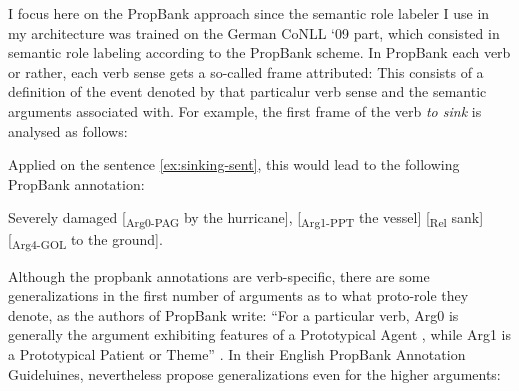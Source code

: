 I focus here on the PropBank approach since the semantic role labeler I use in my
architecture was trained on the German CoNLL `09 \citep{hajivc2009conll} part, which
consisted in semantic role labeling according to the PropBank scheme. In PropBank
each verb or rather, each verb sense gets a so-called frame attributed: This consists
of a definition of the event denoted by that particalur verb sense and the semantic
arguments associated with. For example, the first frame of the verb \emph{to
sink}
is analysed as follows:

\noindent{}

Applied on the sentence  \ref{ex:sinking-sent}, this would lead to the following PropBank annotation:

\begin{examples}
  \item Severely damaged [\textsubscript{Arg0-PAG} by the hurricane], [\textsubscript{Arg1-PPT} the vessel] [\textsubscript{Rel} sank] [\textsubscript{Arg4-GOL} to the ground].
\end{examples}


Although the propbank annotations are verb-specific, there are some generalizations in the first
number of arguments as to what proto-role they denote, as the authors of PropBank write: ``For
a particular verb, Arg0 is generally the argument exhibiting features of a Prototypical Agent
\textelp{}, while Arg1 is a Prototypical Patient or Theme'' \citep[p.~75]{palmer2005proposition}.
In their English PropBank Annotation Guideluines, \cite{bonial2012english} nevertheless propose
generalizations even for the higher arguments:

